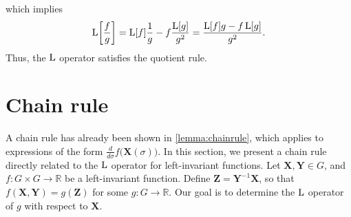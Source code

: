 which implies
\begin{align}
    \operatorname{L}\biggl[\frac{f}{g}\biggr] = \operatorname{L}[f]\frac{1}{g} - f\frac{\operatorname{L}[g]}{g^2} = \frac{\operatorname{L}[f]g - f\operatorname{L}[g]}{g^2}.
\end{align}
Thus, the $\operatorname{L}$ operator satisfies the quotient rule.
\section{Chain rule}
A chain rule has already been shown in \cref{lemma:chainrule}, which applies to expressions of the form $\frac{d}{d\sigma}f\bigl(\mathbf{X}(\sigma)\bigr)$. In this section, we present a chain rule directly related to the $\operatorname{L}$ operator for left-invariant functions. Let $\mathbf{X},\mathbf{Y}\in G$, and $f : G \times G \to \mathbb{R}$ be a left-invariant function. Define $\mathbf{Z} = \mathbf{Y}^{-1}\mathbf{X}$, so that $f(\mathbf{X},\mathbf{Y}) = g(\mathbf{Z})$ for some $g:G\to\mathbb{R}$. Our goal is to determine the $\operatorname{L}$ operator of $g$ with respect to $\mathbf{X}$. 

